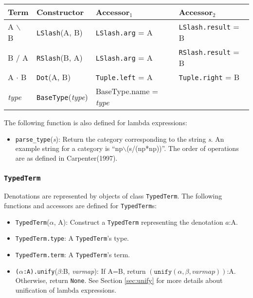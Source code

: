\documentclass[11pt]{article}
\begin{document}
\vspace{3mm}
\begin{tabular}{l|lll}
Term \hspace{1cm} & Constructor \hspace{1cm} 
  & Accessor$_1$ & Accessor$_2$\\
\hline
A $\backslash$ B & \texttt{LSlash}(A, B) 
  & \texttt{LSlash.arg} = A & \texttt{LSlash.result} = B\\
B / A & \texttt{RSlash}(B, A) 
  & \texttt{LSlash.arg} = A & \texttt{RSlash.result} = B\\
A $\cdot$ B & \texttt{Dot}(A, B)
  & \texttt{Tuple.left} = A & \texttt{Tuple.right} = B\\
\textit{type} & \texttt{BaseType}(\textit{type}) 
  & BaseType.name = \textit{type} & \\
\end{tabular}

\vspace{3mm}\noindent
The following function is also defined for lambda expressions:
\begin{itemize}
  \item \texttt{parse\_type}(\textit{s}): Return the category
  corresponding to the string \textit{s}.  An example string for a
  category is ``np$\backslash$(s/(np*np))''.  The order of operations are as
  defined in Carpenter(1997).
\end{itemize}

\subsubsection{\texttt{TypedTerm}}

Denotations are represented by objects of class \texttt{TypedTerm}.
The following functions and accessors are defined for
\texttt{TypedTerm}s:

\begin{itemize}
  \item \texttt{TypedTerm}($\alpha$, A): Construct a \texttt{TypedTerm}
  representing the denotation $a$:A.
  \item \texttt{TypedTerm.type}: A \texttt{TypedTerm}'s type.
  \item \texttt{TypedTerm.term}: A \texttt{TypedTerm}'s term.
  \item \texttt{($\alpha$:A).unify}($\beta$:B, \textit{varmap}): If A=B,
  return $\left(\texttt{unify}(\alpha, \beta, \textit{varmap})\right)$:A.
  Otherwise, return \texttt{None}.  See Section \ref{sec:unify} for
  more details about unification of lambda expressions.
\end{itemize}
\end{document}
